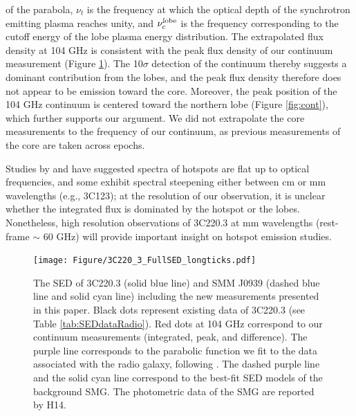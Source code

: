\documentclass[twocolumn,apj,numberedappendix]{emulateapj}
\begin{document}
of the parabola, $\nu_t$ is the frequency at which the optical depth of the synchrotron emitting plasma reaches 
unity, and $\nu_c^{\rm lobe}$ is the frequency corresponding to the cutoff energy of the lobe plasma energy 
distribution. 
The extrapolated flux density at 104 GHz is consistent with the peak flux density of our continuum 
measurement (Figure \ref{fig:SED}). The 10$\sigma$ detection of the continuum thereby suggests
a dominant contribution from the lobes, and the peak flux density therefore does not appear to be emission toward 
the core. Moreover, the peak position of the 104 GHz continuum is
centered toward the northern lobe (Figure \ref{fig:cont}), which further supports our argument. We did not 
extrapolate the core measurements to the frequency of our continuum, as previous measurements of the core are 
taken 
across epochs.\par
Studies by \citet{Meisenheimer89a} and \citet{Hardcastle08a} have suggested spectra of hotspots are flat up to optical frequencies, and some exhibit spectral steepening either between cm or mm wavelengths (e.g., 3C123); at the resolution of our observation, it is unclear whether the integrated flux is dominated by the hotspot or the lobes. Nonetheless, high resolution observations of 3C220.3 at mm wavelengths (rest-frame $\sim$ 60 GHz) will provide important insight on hotspot emission studies. 

\begin{figure}[!tbph]
\centering
\texttt{[image: Figure/3C220\_3\_FullSED\_longticks.pdf]}
\caption{The SED of 3C220.3 (solid blue line) and SMM J0939 (dashed blue line and solid cyan line) including the new measurements presented in this paper. 
Black dots represent existing data of 3C220.3 (see Table \ref{tab:SEDdataRadio}). Red dots at 104 GHz correspond to 
our continuum measurements (integrated, peak, and difference). The purple line corresponds to the parabolic function we 
fit to the data associated with the radio galaxy, following \citet{Cleary07a}. The dashed purple line and 
the solid cyan line correspond to the best-fit SED models of the background SMG. The photometric data of the SMG are reported by H14. \label{fig:SED}}
\end{figure}
\end{document}
